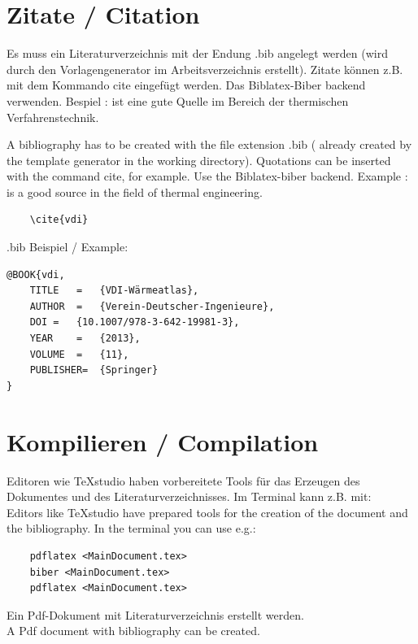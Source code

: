 \documentclass[]{iat}
\begin{document}
\section{Zitate / Citation}
Es muss ein Literaturverzeichnis mit der Endung .bib angelegt werden (wird durch den Vorlagengenerator im Arbeitsverzeichnis erstellt). Zitate können z.B. mit dem Kommando cite eingefügt werden. Das Biblatex-Biber backend verwenden. Bespiel : \cite{vdi} ist eine gute Quelle im Bereich der thermischen Verfahrenstechnik.\par
A bibliography has to be created with the file extension .bib ( already created by the template generator in the working directory). Quotations can be inserted with the command cite, for example. Use the Biblatex-biber backend. Example : \cite{vdi} is a good source in the field of thermal engineering.
\begin{lstlisting}
	\cite{vdi}
\end{lstlisting}
.bib Beispiel / Example:
\begin{lstlisting}
@BOOK{vdi,
	TITLE	=	{VDI-Wärmeatlas},
	AUTHOR	=	{Verein-Deutscher-Ingenieure},
	DOI	=	{10.1007/978-3-642-19981-3},
	YEAR	=	{2013},
	VOLUME	=	{11},
	PUBLISHER=	{Springer}
}

\end{lstlisting}
\section{Kompilieren / Compilation}
Editoren wie TeXstudio haben vorbereitete Tools für das Erzeugen des Dokumentes und des Literaturverzeichnisses. Im Terminal kann z.B. mit:\\
Editors like TeXstudio have prepared tools for the creation of the document and the bibliography. In the terminal you can use e.g.:
\begin{lstlisting}
	pdflatex <MainDocument.tex>
	biber <MainDocument.tex>
	pdflatex <MainDocument.tex>
\end{lstlisting}
Ein Pdf-Dokument mit Literaturverzeichnis erstellt werden.\\
A Pdf document with bibliography can be created.
\printbibliography
\end{document}
